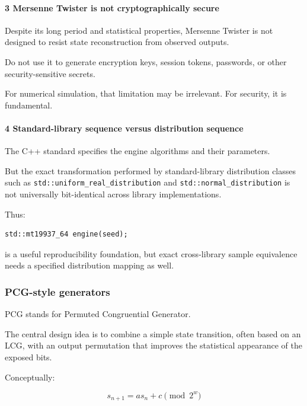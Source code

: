 \paragraph{3 Mersenne Twister is not cryptographically secure}\label{mersenne-twister-is-not-cryptographically-secure}

Despite its long period and statistical properties, Mersenne Twister is not designed to resist state reconstruction from observed outputs.

Do not use it to generate encryption keys, session tokens, passwords, or other security-sensitive secrets.

For numerical simulation, that limitation may be irrelevant. For security, it is fundamental.

\paragraph{4 Standard-library sequence versus distribution sequence}\label{standard-library-sequence-versus-distribution-sequence}

The C++ standard specifies the engine algorithms and their parameters.

But the exact transformation performed by standard-library distribution classes such as \texttt{std::uniform\_real\_distribution} and \texttt{std::normal\_distribution} is not universally bit-identical across library implementations.

Thus:

\begin{verbatim}
std::mt19937_64 engine(seed);
\end{verbatim}

is a useful reproducibility foundation, but exact cross-library sample equivalence needs a specified distribution mapping as well.

\subsubsection{PCG-style generators}\label{pcg-style-generators}

PCG stands for Permuted Congruential Generator.

The central design idea is to combine a simple state transition, often based on an LCG, with an output permutation that improves the statistical appearance of the exposed bits.

Conceptually:

\[
 \boxed{ s_{n+1}=as_n+c\pmod{2^w} }
\]

